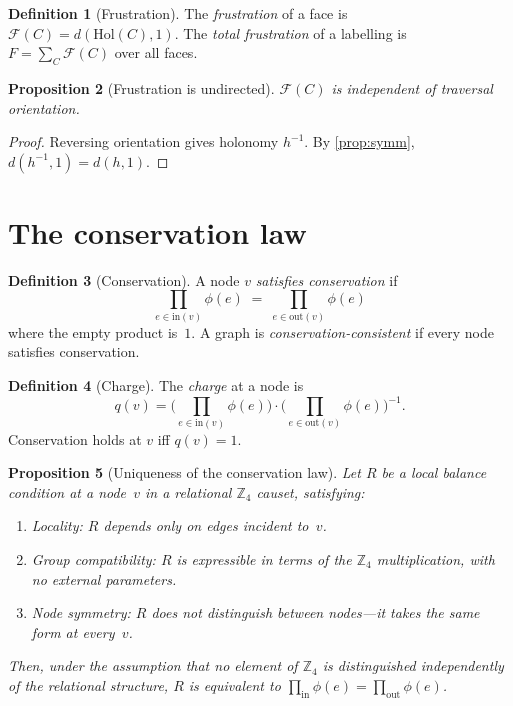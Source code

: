 \documentclass[11pt,a4paper]{article}
\theoremstyle{definition}
\newtheorem{definition}{Definition}[section]
\theoremstyle{plain}
\newtheorem{proposition}[definition]{Proposition}
\theoremstyle{remark}
\newcommand{\Zf}{\mathbb{Z}_4}
\newcommand{\inp}{\mathrm{in}}
\newcommand{\out}{\mathrm{out}}
\newcommand{\Frust}{\mathcal{F}}
\newcommand{\Hol}{\mathrm{Hol}}
\begin{document}
\begin{definition}[Frustration]\label{def:frust}
  The \emph{frustration} of a face is $\Frust(C) = d(\Hol(C), 1)$.  The \emph{total frustration} of a labelling is $F = \sum_C \Frust(C)$ over all faces.
\end{definition}

\begin{proposition}[Frustration is undirected]\label{prop:undirected}
  $\Frust(C)$ is independent of traversal orientation.
\end{proposition}

\begin{proof}
  Reversing orientation gives holonomy $h^{-1}$.  By \cref{prop:symm}, $d(h^{-1}, 1) = d(h, 1)$.
\end{proof}

\section{The conservation law}\label{sec:conservation}

\begin{definition}[Conservation]\label{def:cons}
  A node $v$ \emph{satisfies conservation} if
  \begin{equation}\label{eq:cons}
    \prod_{e \in \inp(v)} \phi(e) \;=\; \prod_{e \in \out(v)} \phi(e)
  \end{equation}
  where the empty product is~$1$.  A graph is \emph{conservation-consistent} if every node satisfies conservation.
\end{definition}

\begin{definition}[Charge]\label{def:charge}
  The \emph{charge} at a node is
  \begin{equation}
    q(v) = \biggl(\prod_{e \in \inp(v)} \phi(e)\biggr) \cdot \biggl(\prod_{e \in \out(v)} \phi(e)\biggr)^{-1}.
  \end{equation}
  Conservation holds at $v$ iff $q(v) = 1$.
\end{definition}

\begin{proposition}[Uniqueness of the conservation law]\label{prop:consunique}
  Let $R$ be a local balance condition at a node~$v$ in a relational $\Zf$ causet, satisfying:
  \begin{enumerate}[nosep,label=(\roman*)]
    \item \emph{Locality}: $R$ depends only on edges incident to~$v$.
    \item \emph{Group compatibility}: $R$ is expressible in terms of the $\Zf$ multiplication, with no external parameters.
    \item \emph{Node symmetry}: $R$ does not distinguish between nodes---it takes the same form at every~$v$.
  \end{enumerate}
  Then, under the assumption that no element of $\Zf$ is distinguished independently of the relational structure, $R$ is equivalent to $\prod_{\inp} \phi(e) = \prod_{\out} \phi(e)$.
\end{proposition}
\end{document}
